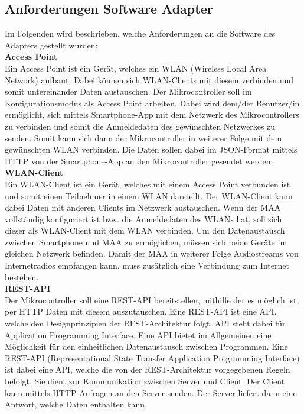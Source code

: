 \documentclass[11pt, twoside]{article}
\begin{document}
\subsection{Anforderungen Software Adapter}
Im Folgenden wird beschrieben, welche Anforderungen an die Software des Adapters gestellt wurden: \newline \\
\textbf{Access Point} \\
Ein Access Point ist ein Gerät, welches ein WLAN (Wireless Local Area Network) aufbaut. Dabei können sich WLAN-Clients mit diesem verbinden und somit untereinander Daten austauschen. \newline
\parencite[vgl.][]{noauthor_urlpi10_nodate-1} \newline
Der Mikrocontroller soll im Konfigurationsmodus als Access Point arbeiten. Dabei wird dem/der Benutzer/in ermöglicht, sich mittels Smartphone-App mit dem Netzwerk des Mikrocontrollers zu verbinden und somit die Anmeldedaten des gewünschten Netzwerkes zu senden. Somit kann sich dann der Mikrocontroller in weiterer Folge mit dem gewünschten WLAN verbinden. Die Daten sollen dabei im JSON-Format mittels HTTP von der Smartphone-App an den Mikrocontroller gesendet werden. \newline \\
\textbf{WLAN-Client} \\
Ein WLAN-Client ist ein Gerät, welches mit einem Access Point verbunden ist und somit einen Teilnehmer in einem WLAN darstellt. Der WLAN-Client kann dabei Daten mit anderen Clients im Netzwerk austauschen. Wenn der MAA vollständig konfiguriert ist bzw. die Anmeldedaten des WLANs hat, soll sich dieser als WLAN-Client mit dem WLAN verbinden. Um den Datenaustausch zwischen Smartphone und MAA zu ermöglichen, müssen sich beide Geräte im gleichen Netzwerk befinden. Damit der MAA in weiterer Folge Audiostreams von Internetradios empfangen kann, muss zusätzlich eine Verbindung zum Internet bestehen. \newline \\
\textbf{REST-API} \\
Der Mikrocontroller soll eine REST-API bereitstellen, mithilfe der es möglich ist, per HTTP Daten mit diesem auszutauschen. Eine REST-API ist eine API, welche den Designprinzipien der REST-Architektur folgt. API steht dabei für \glqq Application Programming Interface\grqq{}. Eine API bietet im Allgemeinen eine Möglichkeit für den einheitlichen Datenaustausch zwischen Programmen. Eine REST-API (Representational State Transfer Application Programming Interface) ist dabei eine API, welche die von der REST-Architektur vorgegebenen Regeln befolgt. Sie dient  zur Kommunikation zwischen Server und Client. Der Client kann mittels HTTP Anfragen an den Server senden. Der Server liefert dann eine Antwort, welche Daten enthalten kann. \parencite[vgl.][]{noauthor_urlpi04_nodate} \newline
\end{document}
